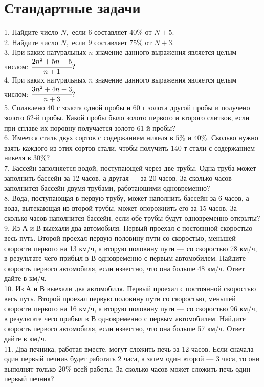 \section{Стандартные задачи}
1. Найдите число $N,$ если 6 составляет $40\%$ от $N+5.$\\
2. Найдите число $N,$ если 9 составляет $75\%$ от $N+3.$\\
3. При каких натуральных $n$ значение данного выражения является целым числом: $\cfrac{2n^2+5n-5}{n+1}?$\\
4. При каких натуральных $n$ значение данного выражения является целым числом: $\cfrac{3n^2+4n-3}{n+3}?$\\
5. Сплавлено 40 г золота одной пробы и 60 г золота другой пробы и получено золото 62-й пробы. Какой пробы было золото первого и второго слитков, если при сплаве их поровну получается золото 61-й пробы?\\
6. Имеется сталь двух сортов с содержанием никеля в $5\%$ и $40\%.$ Сколько нужно взять каждого из этих сортов стали, чтобы получить 140 т стали с содержанием никеля в $30\%?$\\
7. Бассейн заполняется водой, поступающей через две трубы. Одна труба может заполнить бассейн за 12 часов, а другая --- за 20 часов. За сколько часов заполнится бассейн двумя трубами, работающими одновременно?\\
8. Вода, поступающая в первую трубу, может наполнить бассейн за 6 часов, а вода, вытекающая из второй трубы, может опорожнить его за 15 часов. За сколько часов наполнится бассейн, если обе трубы будут одновременно открыты?\\
9. Из А и В выехали два автомобиля. Первый проехал с постоянной скоростью весь путь. Второй проехал первую половину пути со скоростью, меньшей скорости первого на 13 км/ч, а вторую половину пути --- со скоростью 78 км/ч, в результате чего прибыл в В одновременно с первым автомобилем. Найдите скорость первого автомобиля, если известно, что она больше 48 км/ч. Ответ дайте в км/ч.\\
10. Из А и В выехали два автомобиля. Первый проехал с постоянной скоростью весь путь. Второй проехал первую половину пути со скоростью, меньшей скорости первого на 16 км/ч, а вторую половину пути --- со скоростью 96 км/ч, в результате чего прибыл в В одновременно с первым автомобилем. Найдите скорость первого автомобиля, если известно, что она больше 57 км/ч. Ответ дайте в км/ч.\\
11. Два печника, работая вместе, могут сложить печь за 12 часов. Если сначала один первый печник будет работать 2 часа, а затем один второй --- 3 часа, то они выполнят только $20\%$ всей работы. За сколько часов может сложить печь один первый печник?\\
